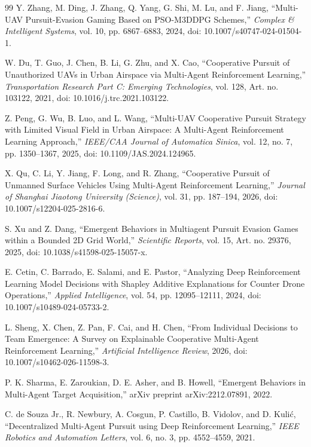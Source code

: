 \documentclass[journal]{IEEEtran}
\begin{document}
\begin{thebibliography}{99}
Y. Zhang, M. Ding, J. Zhang, Q. Yang, G. Shi, M. Lu, and F. Jiang,
``Multi-UAV Pursuit-Evasion Gaming Based on PSO-M3DDPG Schemes,''
\textit{Complex \& Intelligent Systems}, vol. 10, pp. 6867--6883, 2024,
doi: 10.1007/s40747-024-01504-1.

W. Du, T. Guo, J. Chen, B. Li, G. Zhu, and X. Cao,
``Cooperative Pursuit of Unauthorized UAVs in Urban Airspace via Multi-Agent Reinforcement Learning,''
\textit{Transportation Research Part C: Emerging Technologies}, vol. 128, Art. no. 103122, 2021,
doi: 10.1016/j.trc.2021.103122.

Z. Peng, G. Wu, B. Luo, and L. Wang,
``Multi-UAV Cooperative Pursuit Strategy with Limited Visual Field in Urban Airspace: A Multi-Agent Reinforcement Learning Approach,''
\textit{IEEE/CAA Journal of Automatica Sinica}, vol. 12, no. 7, pp. 1350--1367, 2025,
doi: 10.1109/JAS.2024.124965.

X. Qu, C. Li, Y. Jiang, F. Long, and R. Zhang,
``Cooperative Pursuit of Unmanned Surface Vehicles Using Multi-Agent Reinforcement Learning,''
\textit{Journal of Shanghai Jiaotong University (Science)}, vol. 31, pp. 187--194, 2026,
doi: 10.1007/s12204-025-2816-6.

S. Xu and Z. Dang,
``Emergent Behaviors in Multiagent Pursuit Evasion Games within a Bounded 2D Grid World,''
\textit{Scientific Reports}, vol. 15, Art. no. 29376, 2025,
doi: 10.1038/s41598-025-15057-x.

E. Cetin, C. Barrado, E. Salami, and E. Pastor,
``Analyzing Deep Reinforcement Learning Model Decisions with Shapley Additive Explanations for Counter Drone Operations,''
\textit{Applied Intelligence}, vol. 54, pp. 12095--12111, 2024,
doi: 10.1007/s10489-024-05733-2.

L. Sheng, X. Chen, Z. Pan, F. Cai, and H. Chen,
``From Individual Decisions to Team Emergence: A Survey on Explainable Cooperative Multi-Agent Reinforcement Learning,''
\textit{Artificial Intelligence Review}, 2026,
doi: 10.1007/s10462-026-11598-3.

P. K. Sharma, E. Zaroukian, D. E. Asher, and B. Howell,
``Emergent Behaviors in Multi-Agent Target Acquisition,''
arXiv preprint arXiv:2212.07891, 2022.

C. de Souza Jr., R. Newbury, A. Cosgun, P. Castillo, B. Vidolov, and D. Kuli\'{c},
``Decentralized Multi-Agent Pursuit using Deep Reinforcement Learning,''
\textit{IEEE Robotics and Automation Letters}, vol. 6, no. 3, pp. 4552--4559, 2021.


\end{thebibliography}
\end{document}
